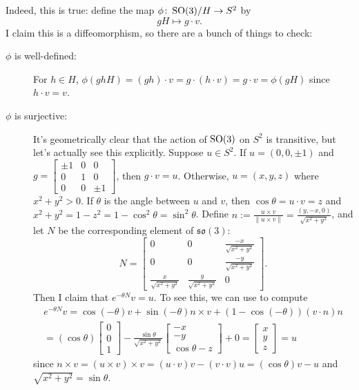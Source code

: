 \begin{example}
	Indeed, this is true: define the map $\phi \colon\thinspace\! \operatorname{SO}(3)/H \to S^2$ by
	\[
		gH \mapsto g \cdot v.
	\]
	I claim this is a diffeomorphism, so there are a bunch of things to check:
	\begin{description}
		\item[$\phi$ is well-defined:] For $h \in H$, $\phi(ghH) = (gh) \cdot v = g \cdot (h \cdot v) = g \cdot v = \phi(gH)$ since $h \cdot v = v$.
		\item[$\phi$ is surjective:] It's geometrically clear that the action of $\operatorname{SO}(3)$ on $S^2$ is transitive, but let's actually see this explicitly. Suppose $u \in S^2$. If $u = (0,0,\pm 1)$ and $g = \begin{bmatrix} \pm 1 & 0 & 0 \\ 0 & 1 & 0 \\ 0 & 0 & \pm 1 \end{bmatrix}$, then $g \cdot v = u$. Otherwise, $u = (x,y,z)$ where $x^2 + y^2 > 0$. If $\theta$ is the angle between $u$ and $v$, then $\cos \theta = u \cdot v = z$ and $x^2 + y^2 = 1-z^2 = 1-\cos^2\theta = \sin^2\theta$. Define $n := \frac{u \times v}{\|u \times v\|} = \frac{(y,-x,0)}{\sqrt{x^2 + y^2}}$, and let $N$ be the corresponding element of $\mathfrak{so}(3)$:
		\[
			N = \begin{bmatrix} 0 & 0 & \frac{-x}{\sqrt{x^2+y^2}} \\
			0 & 0 & \frac{-y}{\sqrt{x^2+y^2}} \\
			\frac{x}{\sqrt{x^2+y^2}} & \frac{y}{\sqrt{x^2+y^2}} & 0 \end{bmatrix}.
		\]
		Then I claim that $e^{-\theta N}v = u$. To see this, we can use  to compute 
		\begin{multline*}
			e^{-\theta N}v  = \cos (-\theta)v + \sin (-\theta) n \times v + (1-\cos (-\theta)) (v \cdot n) n  \\
			= (\cos \theta)\begin{bmatrix} 0  \\ 0 \\ 1 \end{bmatrix} - \frac{ \sin \theta}{\sqrt{x^2 + y^2}}\begin{bmatrix} -x \\ -y \\ \cos \theta -z \end{bmatrix} + 0  = \begin{bmatrix} x \\ y \\ z \end{bmatrix}  = u
		\end{multline*}
		since $n \times v = (u \times v) \times v = (u \cdot v) v - (v \cdot v) u = (\cos \theta)v - u$ and $\sqrt{x^2+y^2} = \sin\theta$.
		

\end{description}
\end{example}
